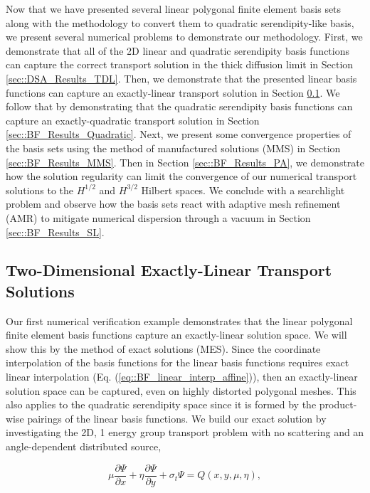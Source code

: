 Now that we have presented several linear polygonal finite element basis sets along with the methodology to convert them to quadratic serendipity-like basis, we present several numerical problems to demonstrate our methodology. First, we demonstrate that all of the 2D linear and quadratic serendipity basis functions can capture the correct transport solution in the thick diffusion limit in Section \ref{sec::DSA_Results_TDL}. Then, we demonstrate that the presented linear basis functions can capture an exactly-linear transport solution in Section \ref{sec::BF_Results_Linear}. We follow that by demonstrating that the quadratic serendipity basis functions can capture an exactly-quadratic transport solution in Section \ref{sec::BF_Results_Quadratic}. Next, we present some convergence properties of the basis sets using the method of manufactured solutions (MMS) in Section \ref{sec::BF_Results_MMS}. Then in Section \ref{sec::BF_Results_PA}, we demonstrate how the solution regularity can limit the convergence of our numerical transport solutions to the $H^{1/2}$ and $H^{3/2}$ Hilbert spaces. We conclude with a searchlight problem and observe how the basis sets react with adaptive mesh refinement (AMR) to mitigate numerical dispersion through a vacuum in Section \ref{sec::BF_Results_SL}.

\subsection{Two-Dimensional Exactly-Linear Transport Solutions}
\label{sec::BF_Results_Linear}

Our first numerical verification example demonstrates that the linear polygonal finite element basis functions capture an exactly-linear solution space. We will show this by the method of exact solutions (MES). Since the coordinate interpolation of the basis functions for the linear basis functions requires exact linear interpolation (Eq. (\ref{eq::BF_linear_interp_affine})), then an exactly-linear solution space can be captured, even on highly distorted polygonal meshes. This also applies to the quadratic serendipity space since it is formed by the product-wise pairings of the linear basis functions. We build our exact solution by investigating the 2D, 1 energy group transport problem with no scattering and an angle-dependent distributed source,

\begin{equation}
\label{eq::BF_Results_Linear_angflux}
\mu \frac{\partial \Psi}{\partial x} + \eta \frac{\partial \Psi}{\partial y} + \sigma_t \Psi = Q(x,y, \mu, \eta), 
\end{equation}

